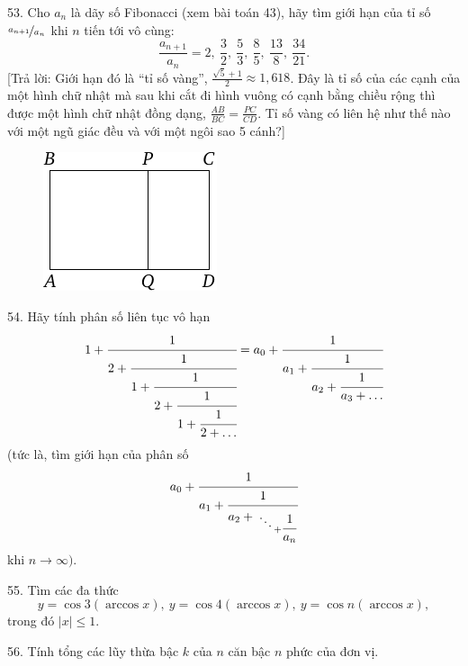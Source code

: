 \begin{problem}{53.}
	Cho $a_n$ là dãy số Fibonacci (xem bài toán 43), hãy tìm giới hạn của tỉ số $\nicefrac{a_{n+1}}{a_n}$ khi $n$ tiến tới vô cùng:
	\begin{equation*}
		\frac{a_{n+1}}{a_n}=2,\ \frac 32,\ \frac53, \ \frac85, \ \frac{13}8,
		\ \frac{34}{21}.
	\end{equation*}
	[Trả lời: Giới hạn đó là \enquote{tỉ số vàng}, $\frac{\sqrt{5}+1}{2}\approx 1,618$. Đây là tỉ số của các cạnh của một hình chữ nhật mà sau khi cắt đi hình vuông có cạnh bằng chiều rộng thì được một hình chữ nhật đồng dạng, $\frac{AB}{BC}=\frac{PC}{CD}$. Tỉ số vàng có liên hệ như thế nào với một ngũ giác đều và với một ngôi sao 5 cánh?]
	\begin{figure}
		\includegraphics{taskbook-37}
	\end{figure}
\end{problem}

\begin{problem}{54.}
	Hãy tính phân số liên tục vô hạn
	\begin{equation*}
		1+\cfrac{1}{2+\cfrac{1}{1+\cfrac{1}{2+\cfrac{1}{1+\cfrac{1}{2+\ldots}}}}}=
		a_0+\cfrac{1}{a_1+\cfrac{1}{a_2+\cfrac{1}{a_3+\dots}}}
	\end{equation*}
	(tức là, tìm giới hạn của phân số 
	\begin{equation*}
		a_0+\cfrac{1}{a_1+\cfrac{1}{a_2+{\atop{\ddots \atop {}} + \cfrac{1}{a_n}}}}
	\end{equation*}
	khi $n\rightarrow \infty)$.
\end{problem}

\begin{problem}{55.}
	Tìm các đa thức 
	\begin{equation*}
		y=\cos 3 (\arccos x),\ y=\cos 4 (\arccos x),\ 
		y=\cos n (\arccos x),
	\end{equation*}
	trong đó $|x| \leqslant 1$.
\end{problem}

\begin{problem}{56.}
	Tính tổng các lũy thừa bậc $k$ của $n$ căn bậc $n$ phức của đơn vị. 
\end{problem}

